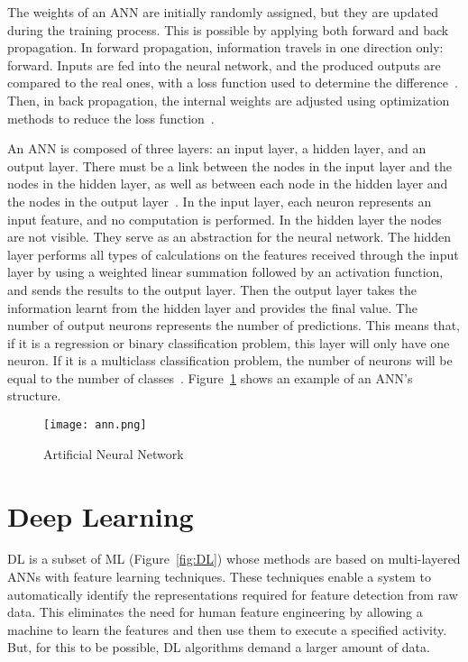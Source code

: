     The weights of an \gls{ANN} are initially randomly assigned, but they are updated during the training process. This is possible by applying both forward and back propagation. In forward propagation, information travels in one direction only: forward. Inputs are fed into the neural network, and the produced outputs are compared to the real ones, with a loss function used to determine the difference~\cite{Farizawani2020AApproaches}. Then, in back propagation, the internal weights are adjusted using optimization methods to reduce the loss function~\cite{Kim2021CBP:Method}. 
    
    An \gls{ANN} is composed of three layers: an input layer, a hidden layer, and an output layer. There must be a link between the nodes in the input layer and the nodes in the hidden layer, as well as between each node in the hidden layer and the nodes in the output layer~\cite{Imran2019AClassification}. In the input layer, each neuron represents an input feature, and no computation is performed. In the hidden layer the nodes are not visible. They serve as an abstraction for the neural network. The hidden layer performs all types of calculations on the features received through the input layer by using a weighted linear summation followed by an activation function, and sends the results to the output layer. Then the output layer takes the information learnt from the hidden layer and provides the final value. The number of output neurons represents the number of predictions. This means that, if it is a regression or binary classification problem, this layer will only have one neuron. If it is a multiclass classification problem, the number of neurons will be equal to the number of classes~\cite{Alaloul2020DataNetworks}. Figure~\ref{fig:ann} shows an example of an \gls{ANN}'s structure.
    
    \begin{figure}[htbp]
        \centering
        \texttt{[image: ann.png]}
        \caption{Artificial Neural Network~\cite{CastrounisAIExplained}}
        \label{fig:ann}
    \end{figure}

\section{Deep Learning}\label{sec:dl}

\gls{DL} is a subset of \gls{ML} (Figure~\ref{fig:DL}) whose methods are based on multi-layered \gls{ANN}s with feature learning techniques. These techniques enable a system to automatically identify the representations required for feature detection from raw data. This eliminates the need for human feature engineering by allowing a machine to learn the features and then use them to execute a specified activity. But, for this to be possible, \gls{DL} algorithms demand a larger amount of data.

